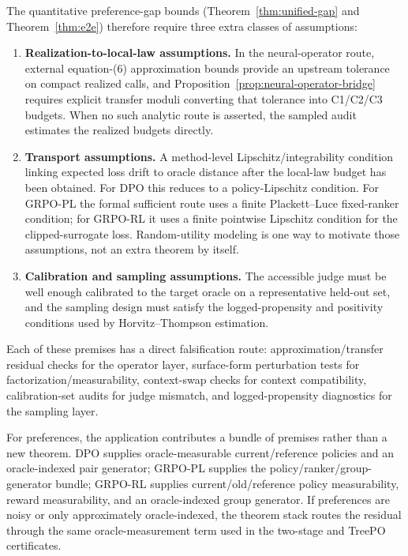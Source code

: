 The quantitative preference-gap bounds (Theorem~\ref{thm:unified-gap} and Theorem~\ref{thm:e2e}) therefore require three extra classes of assumptions:
\begin{enumerate}[leftmargin=1.5em]
    \item \textbf{Realization-to-local-law assumptions.} In the neural-operator route, external equation-(6) approximation bounds provide an upstream tolerance on compact realized calls, and Proposition~\ref{prop:neural-operator-bridge} requires explicit transfer moduli converting that tolerance into C1/C2/C3 budgets. When no such analytic route is asserted, the sampled audit estimates the realized budgets directly.
    \item \textbf{Transport assumptions.} A method-level Lipschitz/integrability condition linking expected loss drift to oracle distance after the local-law budget has been obtained. For DPO this reduces to a policy-Lipschitz condition. For GRPO-PL the formal sufficient route uses a finite Plackett--Luce fixed-ranker condition; for GRPO-RL it uses a finite pointwise Lipschitz condition for the clipped-surrogate loss. Random-utility modeling \citep{Schervish1995} is one way to motivate those assumptions, not an extra theorem by itself.
    \item \textbf{Calibration and sampling assumptions.} The accessible judge must be well enough calibrated to the target oracle on a representative held-out set, and the sampling design must satisfy the logged-propensity and positivity conditions used by Horvitz--Thompson estimation.
\end{enumerate}

Each of these premises has a direct falsification route: approximation/transfer residual checks for the operator layer, surface-form perturbation tests for factorization/measurability, context-swap checks for context compatibility, calibration-set audits for judge mismatch, and logged-propensity diagnostics for the sampling layer.

For preferences, the application contributes a bundle of premises rather
than a new theorem. DPO supplies oracle-measurable current/reference
policies and an oracle-indexed pair generator; GRPO-PL supplies the
policy/ranker/group-generator bundle; GRPO-RL supplies current/old/reference
policy measurability, reward measurability, and an oracle-indexed group
generator. If preferences are noisy or only approximately oracle-indexed,
the theorem stack routes the residual through the same oracle-measurement
term used in the two-stage and TreePO certificates.

